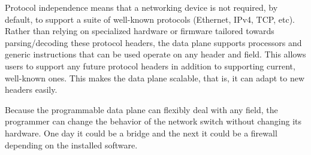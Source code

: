 Protocol independence means that a networking device is not required, by default, to support
a suite of well-known protocols (Ethernet, IPv4, TCP, etc).
Rather than relying on specialized hardware or firmware tailored towards
parsing/decoding
these protocol headers, the data plane supports processors
and generic instructions that can be used operate on
any header and field.
This allows users to support any future protocol headers in addition to
supporting current, well-known ones. This makes the data plane scalable, that is, it
can adapt to new headers easily.

Because the programmable data plane can flexibly deal with any field, the programmer can change the behavior of the network switch without changing its hardware. One day it could be a bridge and the next it could be a firewall depending on the installed software.

%
%




